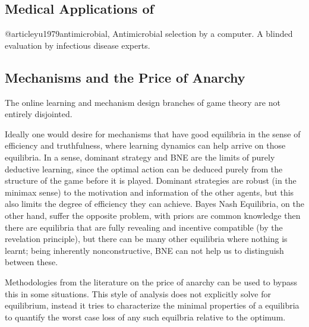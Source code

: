 \subsection{Medical Applications of }


@article{yu1979antimicrobial},
Antimicrobial selection by a computer. A blinded evaluation by infectious disease experts.


\subsection{Mechanisms and the Price of Anarchy}

The online learning and mechanism design branches of game theory are not entirely disjointed. 

Ideally one would desire for mechanisms that have good equilibria in the sense of efficiency and truthfulness, where learning dynamics can help arrive on those equilibria. 
In a sense, dominant strategy and BNE are the limits of purely deductive learning, since the optimal action can be deduced purely from the structure of the game before it is played.
Dominant strategies are robust (in the minimax sense) to the motivation and information of the other agents, but this also limits the degree of efficiency they can achieve. 
Bayes Nash Equilibria, on the other hand, suffer the opposite problem, with priors are common knowledge then there are equilibria that are fully revealing and incentive compatible (by the revelation principle), but there can be many other equilibria where nothing is learnt; being inherently nonconstructive, BNE can not help us to distinguish between these. 


Methodologies from the literature on the price of anarchy can be used to bypass this in some situations.
This style of analysis does not explicitly solve for equilibrium, instead it tries to characterize the minimal properties of a equilibria to quantify the worst case loss of any such equilbria relative to the optimum.

